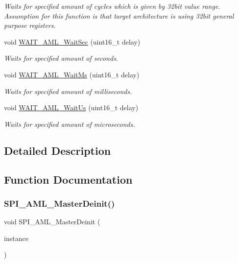 \begin{DoxyCompactItemize}
$$\begin{DoxyCompactList}\small\item\em Waits for specified amount of cycles which is given by 32bit value range. Assumption for this function is that target architecture is using 32bit general purpose registers. \end{DoxyCompactList}\item 
void \mbox{\hyperlink{group__function__group_ga2cc4c9ff3ce6add5f7d02798bebb1939}{W\+A\+I\+T\+\_\+\+A\+M\+L\+\_\+\+Wait\+Sec}} (uint16\+\_\+t delay)
\begin{DoxyCompactList}\small\item\em Waits for specified amount of seconds. \end{DoxyCompactList}\item 
void \mbox{\hyperlink{group__function__group_ga91059b3fe779d0ca7074c59bacb42f59}{W\+A\+I\+T\+\_\+\+A\+M\+L\+\_\+\+Wait\+Ms}} (uint16\+\_\+t delay)
\begin{DoxyCompactList}\small\item\em Waits for specified amount of milliseconds. \end{DoxyCompactList}\item 
void \mbox{\hyperlink{group__function__group_gac71523b2fdbddc5d35c018502abbd770}{W\+A\+I\+T\+\_\+\+A\+M\+L\+\_\+\+Wait\+Us}} (uint16\+\_\+t delay)
\begin{DoxyCompactList}\small\item\em Waits for specified amount of microseconds. \end{DoxyCompactList}\end{DoxyCompactItemize}


\subsection{Detailed Description}


\subsection{Function Documentation}
\mbox{\label{group__function__group_gac0af5f79571c9a899c723c996d37a8b0}} 
\subsubsection{\texorpdfstring{SPI\_AML\_MasterDeinit()}{SPI\_AML\_MasterDeinit()}}
{\footnotesize\ttfamily void S\+P\+I\+\_\+\+A\+M\+L\+\_\+\+Master\+Deinit (\begin{DoxyParamCaption}\item[{\mbox{\hyperlink{common__aml_8h_a562bd37c7d07adcedec5993bc0cd96e5}{aml\+\_\+instance\+\_\+t}}}]{instance }\end{DoxyParamCaption})}



